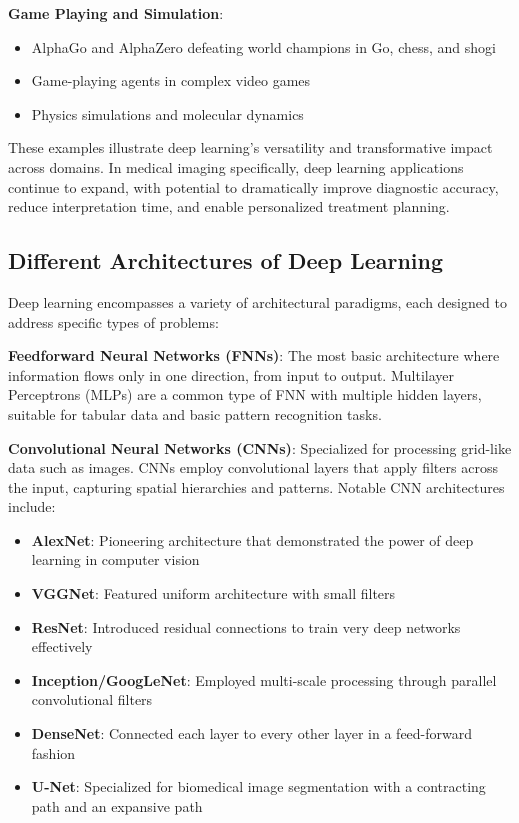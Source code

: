 \textbf{Game Playing and Simulation}:
\begin{itemize}
  \item AlphaGo and AlphaZero defeating world champions in Go, chess, and shogi
  \item Game-playing agents in complex video games
  \item Physics simulations and molecular dynamics
\end{itemize}

These examples illustrate deep learning's versatility and transformative impact across domains. In medical imaging specifically, deep learning applications continue to expand, with potential to dramatically improve diagnostic accuracy, reduce interpretation time, and enable personalized treatment planning.

\subsection{Different Architectures of Deep Learning}
\label{sec:dl_architectures}
Deep learning encompasses a variety of architectural paradigms, each designed to address specific types of problems:

\textbf{Feedforward Neural Networks (FNNs)}:
The most basic architecture where information flows only in one direction, from input to output. Multilayer Perceptrons (MLPs) are a common type of FNN with multiple hidden layers, suitable for tabular data and basic pattern recognition tasks.

\textbf{Convolutional Neural Networks (CNNs)}:
Specialized for processing grid-like data such as images. CNNs employ convolutional layers that apply filters across the input, capturing spatial hierarchies and patterns. Notable CNN architectures include:
\begin{itemize}
  \item \textbf{AlexNet}: Pioneering architecture that demonstrated the power of deep learning in computer vision \cite{krizhevsky2012imagenet}
  \item \textbf{VGGNet}: Featured uniform architecture with small filters \cite{simonyan2014very}
  \item \textbf{ResNet}: Introduced residual connections to train very deep networks effectively \cite{he2016deep}
  \item \textbf{Inception/GoogLeNet}: Employed multi-scale processing through parallel convolutional filters \cite{szegedy2015going}
  \item \textbf{DenseNet}: Connected each layer to every other layer in a feed-forward fashion \cite{huang2017densely}
  \item \textbf{U-Net}: Specialized for biomedical image segmentation with a contracting path and an expansive path \cite{ronneberger2015unet}
\end{itemize}

